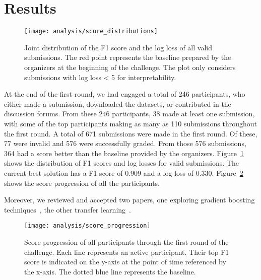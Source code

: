 \documentclass[sigconf]{acmart}
\begin{document}
\section{Results}


\begin{figure}[t]
\centering
\texttt{[image: analysis/score\_distributions]}
\caption{Joint distribution of the F1 score and the log loss of all valid submissions. The red point represents the baseline prepared by the organizers at the beginning of the challenge. The plot only considers submissions with log loss < 5 for interpretability.}
\label{fig:jointplot}
\end{figure}


At the end of the first round, we had engaged a total of 246 participants, who either made a submission, downloaded the datasets, or contributed in the discussion forums. From these 246 participants, 38 made at least one submission, with some of the top participants making as many as 110 submissions throughout the first round.
A total of 671 submissions were made in the first round. Of these, 77 were invalid and 576 were successfully graded.
From those 576 submissions, 364 had a score better than the baseline provided by the organizers. Figure~\ref{fig:jointplot} shows the distribution of F1 scores and log losses for valid submissions.
The current best solution has a F1 score of $0.909$ and a log loss of $0.330$. %
Figure~\ref{fig:timeline} shows the score progression of all the participants.

Moreover, we reviewed and accepted two papers, one exploring gradient boosting techniques~\cite{gradient_boosting}, the other transfer learning~\cite{transfer_learning}.


\begin{figure}[t]
\centering
\texttt{[image: analysis/score\_progression]}
\caption{Score progression of all participants through the first round of the challenge. Each line represents an active participant. Their top F1 score is indicated on the y-axis at the point of time referenced by the x-axis. The dotted blue line represents the baseline.}
\label{fig:timeline}
\end{figure}
\end{document}
